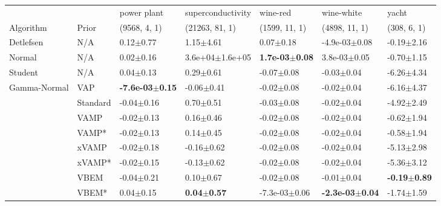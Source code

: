\begin{tabular}{lllllll}
\midrule
             &       &                 power plant &       superconductivity &                   wine-red &                  wine-white &                    yacht \\
Algorithm & Prior& (9568, 4, 1)& (21263, 81, 1)& (1599, 11, 1)& (4898, 11, 1)& (308, 6, 1)\\
\midrule
Detlefsen & N/A &               0.12$\pm$0.77 &           1.15$\pm$4.61 &              0.07$\pm$0.18 &           -4.9e-03$\pm$0.08 &           -0.19$\pm$2.16 \\
Normal & N/A &               0.02$\pm$0.16 &     3.6e+04$\pm$1.6e+05 &  \textbf{1.7e-03$\pm$0.08} &            3.8e-03$\pm$0.05 &           -0.70$\pm$1.15 \\
Student & N/A &               0.04$\pm$0.13 &           0.29$\pm$0.61 &             -0.07$\pm$0.08 &              -0.03$\pm$0.04 &           -6.26$\pm$4.34 \\
Gamma-Normal & VAP &  \textbf{-7.6e-03$\pm$0.15} &          -0.06$\pm$0.41 &             -0.02$\pm$0.08 &              -0.02$\pm$0.04 &           -6.16$\pm$4.37 \\
             & Standard &              -0.04$\pm$0.16 &           0.70$\pm$0.51 &             -0.03$\pm$0.08 &              -0.02$\pm$0.04 &           -4.92$\pm$2.49 \\
             & VAMP &              -0.02$\pm$0.13 &           0.16$\pm$0.46 &             -0.02$\pm$0.08 &              -0.02$\pm$0.04 &           -0.62$\pm$1.94 \\
             & VAMP* &              -0.02$\pm$0.13 &           0.14$\pm$0.45 &             -0.02$\pm$0.08 &              -0.02$\pm$0.04 &           -0.58$\pm$1.94 \\
             & xVAMP &              -0.02$\pm$0.18 &          -0.16$\pm$0.62 &             -0.02$\pm$0.08 &              -0.02$\pm$0.04 &           -5.13$\pm$2.98 \\
             & xVAMP* &              -0.02$\pm$0.15 &          -0.13$\pm$0.62 &             -0.02$\pm$0.08 &              -0.02$\pm$0.04 &           -5.36$\pm$3.12 \\
             & VBEM &              -0.04$\pm$0.21 &           0.10$\pm$0.67 &             -0.02$\pm$0.08 &              -0.01$\pm$0.04 &  \textbf{-0.19$\pm$0.89} \\
             & VBEM* &               0.04$\pm$0.15 &  \textbf{0.04$\pm$0.57} &          -7.3e-03$\pm$0.06 &  \textbf{-2.3e-03$\pm$0.04} &           -1.74$\pm$1.59 \\
\bottomrule
\end{tabular}

